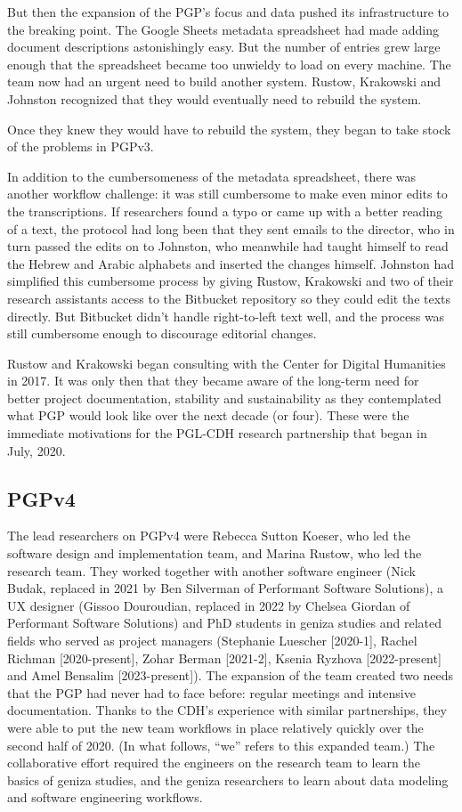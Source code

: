 \documentclass{article}
\begin{document}
But then the expansion of the PGP’s focus and data pushed its infrastructure to the breaking point. The Google Sheets metadata spreadsheet had made adding document descriptions astonishingly easy. But the number of entries grew large enough that the spreadsheet became too unwieldy to load on every machine. The team now had an urgent need to build another system. Rustow, Krakowski and Johnston recognized that they would eventually need to rebuild the system. 

Once they knew they would have to rebuild the system, they began to take stock of the problems in PGPv3. 

In addition to the cumbersomeness of the metadata spreadsheet, there was another workflow challenge: it was still cumbersome to make even minor edits to the transcriptions. If researchers found a typo or came up with a better reading of a text, the protocol had long been that they sent emails to the director, who in turn passed the edits on to Johnston, who meanwhile had taught himself to read the Hebrew and Arabic alphabets and inserted the changes himself. Johnston had simplified this cumbersome process by giving Rustow, Krakowski and two of their research assistants access to the Bitbucket repository so they could edit the texts directly. But Bitbucket didn’t handle right-to-left text well, and the process was still cumbersome enough to discourage editorial changes. 

Rustow and Krakowski began consulting with the Center for Digital Humanities in 2017. It was only then that they became aware of the long-term need for better project documentation, stability and sustainability as they contemplated what PGP would look like over the next decade (or four). These were the immediate motivations for the PGL-CDH research partnership that began in July, 2020.

\subsection{PGPv4}

The lead researchers on PGPv4 were Rebecca Sutton Koeser, who led the software design and implementation team, and Marina Rustow, who led the research team. They worked together with another software engineer (Nick Budak, replaced in 2021 by Ben Silverman of Performant Software Solutions), a UX designer (Gissoo Douroudian, replaced in 2022 by Chelsea Giordan of Performant Software Solutions) and PhD students in geniza studies and related fields who served as project managers (Stephanie Luescher [2020-1], Rachel Richman [2020-present], Zohar Berman [2021-2], Ksenia Ryzhova [2022-present] and Amel Bensalim [2023-present]). The expansion of the team created two needs that the PGP had never had to face before: regular meetings and intensive documentation. Thanks to the CDH’s experience with similar partnerships, they were able to put the new team workflows in place relatively quickly over the second half of 2020. (In what follows, “we” refers to this expanded team.) The collaborative effort required the engineers on the research team to learn the basics of geniza studies, and the geniza researchers to learn about data modeling and software engineering workflows.
\end{document}
